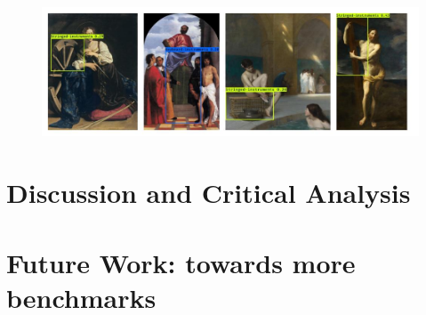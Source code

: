 \begin{figure}[ht!]
\centering
  \includegraphics[width=\linewidth]{./Images/Chapter05/false_positives_3}
  \caption{}
  \label{fig:false_positives_3}
\end{figure}





\section{Discussion and Critical Analysis}
\label{sec:discussion}






\section{Future Work: towards more benchmarks}
\label{sec:future_work}
